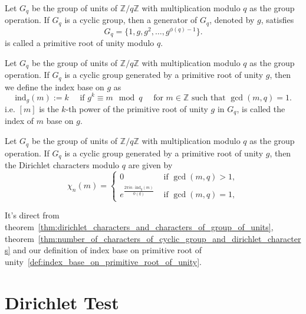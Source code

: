 \documentclass{elegantbook}
\begin{document}
\begin{definition}
  Let $G_q$ be the group of units of $\mathbb{Z}/q\mathbb{Z}$ with multiplication modulo $q$ as the group operation. If $G_q$ is a cyclic group, then a generator of $G_q$, denoted by $g$, satisfies
  \[
    G_q = \{ 1, g, g^2, \ldots, g^{\phi(q)-1} \}.
  \]
  is called a primitive root of unity modulo $q$.
\end{definition}

\begin{definition} \label{def:index_base_on_primitive_root_of_unity}
  Let $G_q$ be the group of units of $\mathbb{Z}/q\mathbb{Z}$ with multiplication modulo $q$ as the group operation. If $G_q$ is a cyclic group generated by a primitive root of unity $g$, then we define the index base on $g$ as
  \[
    \mathrm{ind}_g(m) := k \quad \text{ if } g^k \equiv m \mod q \quad \text{ for } m \in \mathbb{Z} \text{ such that } \gcd(m,q) = 1.
  \]
  i.e. $[m]$ is the $k$-th power of the primitive root of unity $g$ in $G_q$, is called the index of $m$ base on $g$.
\end{definition}

\begin{definition} \label{thm:explicit_form_of_dirichlet_characters_when_group_of_units_is_cyclic}
  Let $G_q$ be the group of units of $\mathbb{Z}/q\mathbb{Z}$ with multiplication modulo $q$ as the group operation. If $G_q$ is a cyclic group generated by a primitive root of unity $g$, then the Dirichlet characters modulo $q$ are given by
  \[
    \chi_n(m) = \begin{cases}
      0 & \text{ if } \gcd(m,q) > 1, \\
      e^{\frac{2\pi i n \cdot \mathrm{ind}_g(m)}{\phi(q)}} & \text{ if } \gcd(m,q) = 1,
    \end{cases}
  \]
\end{definition}

\begin{remark}
  It's direct from theorem~\ref{thm:dirichlet_characters_and_characters_of_group_of_units}, theorem~\ref{thm:number_of_characters_of_cyclic_group_and_dirichlet_characters} and our definition of index base on primitive root of unity~\ref{def:index_base_on_primitive_root_of_unity}.
\end{remark}


\section{Dirichlet Test}
\end{document}
